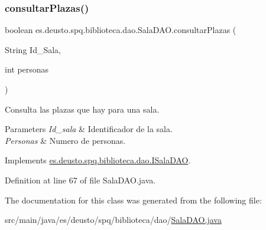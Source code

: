 \subsubsection{\texorpdfstring{consultar\+Plazas()}{consultarPlazas()}}
{\footnotesize\ttfamily boolean es.\+deusto.\+spq.\+biblioteca.\+dao.\+Sala\+D\+A\+O.\+consultar\+Plazas (\begin{DoxyParamCaption}\item[{String}]{Id\+\_\+\+Sala,  }\item[{int}]{personas }\end{DoxyParamCaption})}

Consulta las plazas que hay para una sala. 
\begin{DoxyParams}{Parameters}
{\em Id\+\_\+sala} & Identificador de la sala. \\
\hline
{\em Personas} & Numero de personas. \\
\hline
\end{DoxyParams}


Implements \mbox{\hyperlink{interfacees_1_1deusto_1_1spq_1_1biblioteca_1_1dao_1_1_i_sala_d_a_o_af12c5fe6a1abe11bc65e1118d991f926}{es.\+deusto.\+spq.\+biblioteca.\+dao.\+I\+Sala\+D\+AO}}.



Definition at line 67 of file Sala\+D\+A\+O.\+java.



The documentation for this class was generated from the following file\+:\begin{DoxyCompactItemize}
\item 
src/main/java/es/deusto/spq/biblioteca/dao/\mbox{\hyperlink{_sala_d_a_o_8java}{Sala\+D\+A\+O.\+java}}\end{DoxyCompactItemize}
